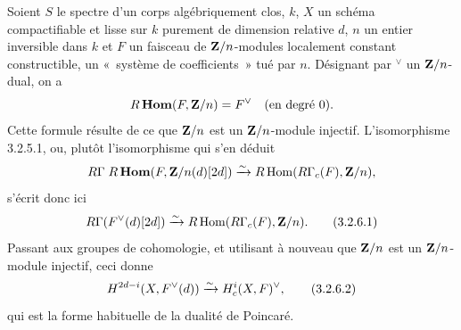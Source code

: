 \documentclass[10pt]{../fichiers-configuration-latex/smfart}
\begin{document}
\setcounter{subsubsection}{5}
\subsubsection{}
Soient $S$ le spectre d'un corps algébriquement clos, $k$, $X$ un
schéma compactifiable et lisse sur $k$ purement de dimension relative
$d$, $n$ un entier inversible dans $k$ et $F$ un faisceau de
$\mathbf{Z}/n$-modules localement constant constructible, \ie un « système de coefficients »  tué par $n$. Désignant par
${}^\vee$ un $\mathbf{Z}/n$-dual, on a
$$
R\operatorname{\mathbf{Hom}}(F,\mathbf{Z}/n)=F^{\vee}\quad\text{\rm (en degré 0)}{}.
$$
Cette formule résulte de ce que $\mathbf{Z}/n$ est un
$\mathbf{Z}/n$-module injectif. L'isomorphisme 3.2.5.1, ou, plutôt
l'isomorphisme qui s'en déduit
$$
R\Gamma\;R\operatorname{\mathbf{Hom}}(F,\mathbf{Z}/n(d)[2d])\xrightarrow{\sim}
R\operatorname{Hom}(R\Gamma_{c}(F),\mathbf{Z}/n){},
$$
s'écrit donc ici
\begin{equation*}
R\Gamma (F^{\vee}(d)[2d])\xrightarrow{\sim} R\operatorname{Hom}
(R\Gamma_{c}(F),\mathbf{Z}/n){}.\tag{3.2.6.1}
\end{equation*}%
Passant aux groupes de cohomologie, et utilisant à nouveau que
$\mathbf{Z}/n$ est un $\mathbf{Z}/n$-module injectif, ceci donne
\begin{equation*}
H^{2d-i}(X,F^{\vee}(d))\xrightarrow{\sim}H^{i}_{c}(X,F)^{\vee}{},\tag{3.2.6.2}
\end{equation*}%
qui est la forme habituelle de la dualité de Poincaré.
\end{document}
